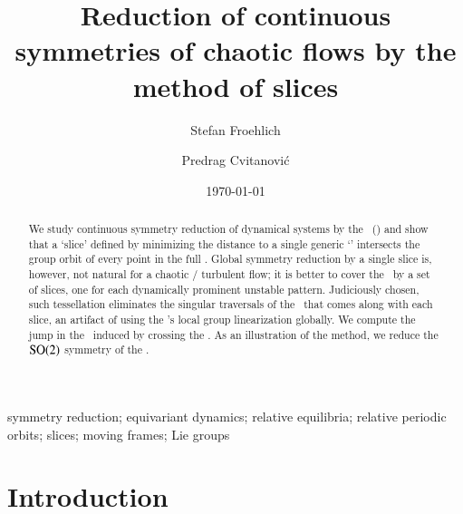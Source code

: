 \documentclass[preprint,12pt]{elsarticle} %
\begin{document}
\title{Reduction of continuous symmetries of chaotic flows
       by the method of slices}

\author{Stefan Froehlich}

\author{Predrag Cvitanovi\'{c}}

\address{Center for Nonlinear Science,
        School of Physics, Georgia Institute of Technology,
        Atlanta, GA 30332-0430}

\date{\today}

\begin{abstract}
We study continuous symmetry reduction of dynamical systems
by the \mslices\ (\mframes) and show that a `slice'
defined by minimizing the distance to a single generic `{\template}'
intersects the group orbit of every point in the full {\statesp}. Global
symmetry reduction by a single slice is, however, not natural for a
chaotic / turbulent flow; it is better to cover the \reducedsp\ by a set
of slices, one for each dynamically prominent unstable pattern.
Judiciously chosen, such tessellation eliminates the singular traversals
of the \sset\ that comes along with each slice, an artifact of using the
{\template}'s local group linearization globally. We compute the jump in
the \reducedsp\ induced by crossing the \sset. As an illustration of the
method, we reduce the $\textrm{SO}(2)$ symmetry of the \cLe.
\end{abstract}

\begin{keyword}
	symmetry reduction; equivariant dynamics; relative equilibria;
	relative periodic orbits; slices; moving frames; Lie groups
\end{keyword}

\maketitle %

\section{Introduction}
    \label{sec:intro}
\end{document}
